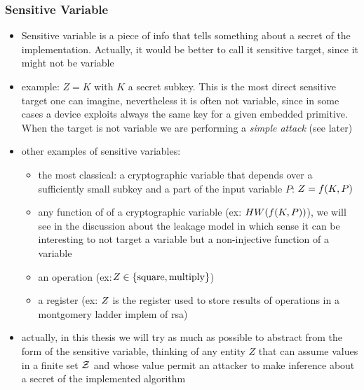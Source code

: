 \subsubsection{Sensitive Variable}
\begin{itemize}
\item Sensitive variable is a piece of info that tells something about a secret of the implementation. Actually, it would be better to call it sensitive target, since it might not be variable
\item example: $Z = K$ with $K$ a secret subkey. This is the most direct sensitive target one can imagine, nevertheless it is often not variable, since in some cases a device exploits always the same key for a given embedded primitive. When the target is not variable we are performing a \emph{simple attack} (see later)
\item other examples of sensitive variables: 
\begin{itemize}
\item the most classical: a cryptographic variable that depends over a sufficiently small subkey and a part of the input  variable $P$: $Z = f(K,P)$
\item any function of of a cryptographic variable (ex: $HW(f(K,P))$), we will see in the discussion about the leakage model in which sense it can be interesting to not target a variable but a non-injective function of a variable
\item an operation (ex:$Z \in \{\mathrm{square}, \mathrm{multiply}\}$)
\item a register (ex: $Z$ is the register used to store results of operations in a montgomery ladder implem of rsa)
\end{itemize}
\item actually, in this thesis we will try as much as possible to abstract from the form of the sensitive variable, thinking of any entity $Z$ that can assume values in a finite set $\mathcal{Z}$ and whose value permit an attacker to make inference about a secret of the implemented algorithm
\end{itemize}
